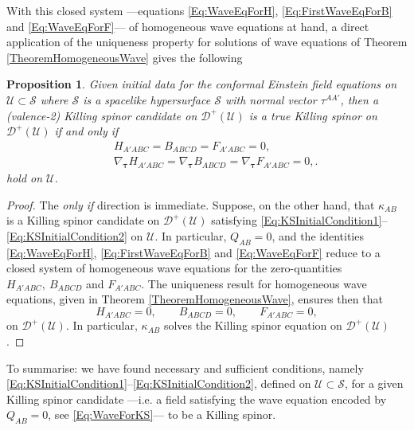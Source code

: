 \documentclass[10pt,a4paper]{article}
\theoremstyle{plain}
\newtheorem{proposition}{Proposition}
\begin{document}
With this closed system ---equations \eqref{Eq:WaveEqForH},
\eqref{Eq:FirstWaveEqForB} and \eqref{Eq:WaveEqForF}--- of homogeneous
wave equations at hand, a direct application of the uniqueness
property for solutions of wave equations of Theorem
\ref{TheoremHomogeneousWave} gives the following
\begin{proposition}\label{Prop:Propagation_KS}
  Given initial data for the conformal Einstein field equations on
  $\mathcal{U}\subset\mathcal{S}$ where $\mathcal{S}$ is a spacelike
  hypersurface $\mathcal{S}$ with normal vector $\tau^{AA'}$, then a
  (valence-2) Killing spinor candidate on
  $\mathcal{D}^{+}(\mathcal{U})$ is a true Killing spinor on
  $\mathcal{D}^{+}(\mathcal{U})$ if and only if
\begin{subequations}
\begin{eqnarray}
  &&
  H_{A'ABC}=B_{ABCD}=F_{A'ABC}=0,\label{Eq:KSInitialCondition1}\\ &&
  \nabla_{\bm\tau} H_{A'ABC}=\nabla_{\bm\tau} B_{ABCD}=
  \nabla_{\bm\tau} F_{A'ABC}=0, \label{Eq:KSInitialCondition2}.
\end{eqnarray}
\end{subequations}
hold on $\mathcal{U}$.
\end{proposition}
\begin{proof}
The \emph{only if} direction is immediate. Suppose, on the other hand,
that $\kappa_{AB}$ is a Killing spinor candidate on
$\mathcal{D}^+(\mathcal{U})$ satisfying
\eqref{Eq:KSInitialCondition1}--\eqref{Eq:KSInitialCondition2} on
$\mathcal{U}$. In particular, $Q_{AB}=0$, and the identities
\eqref{Eq:WaveEqForH}, \eqref{Eq:FirstWaveEqForB} and
\eqref{Eq:WaveEqForF} reduce to a closed system of homogeneous wave
equations for the zero-quantities $H_{A'ABC},~B_{ABCD}$ and
$F_{A'ABC}$. The uniqueness result for homogeneous wave equations,
given in Theorem \ref{TheoremHomogeneousWave},
ensures then that
\[ H_{A'ABC}=0,\qquad B_{ABCD}=0, \qquad F_{A'ABC}=0,\]
on $\mathcal{D}^{+}(\mathcal{U})$. In particular,
$\kappa_{AB}$ solves the Killing spinor equation on $\mathcal{D}^{+}(\mathcal{U})$.
\end{proof}

To summarise: we have found necessary and sufficient conditions,
namely \eqref{Eq:KSInitialCondition1}--\eqref{Eq:KSInitialCondition2},
defined on $\mathcal{U}\subset \mathcal{S}$, for a given Killing
spinor candidate ---i.e. a field satisfying the wave equation
encoded by $Q_{AB}=0$, see \eqref{Eq:WaveForKS}--- to be a Killing spinor.
\end{document}
